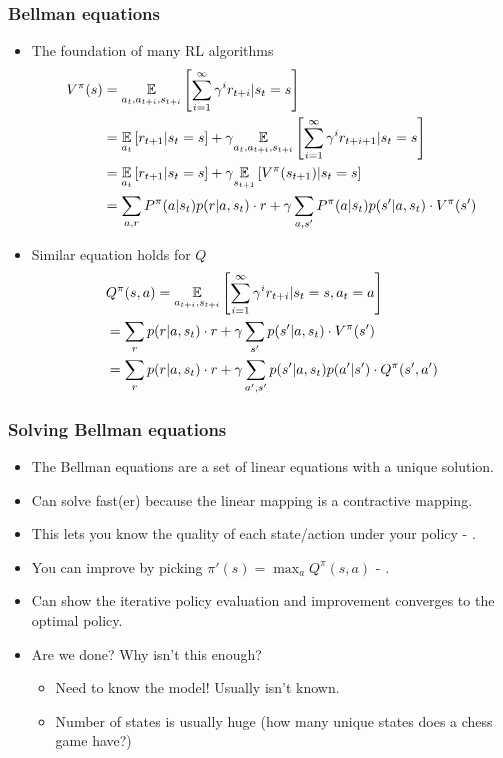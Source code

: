 \documentclass[handout]{beamer}
\begin{document}
\begin{frame}\frametitle{Bellman equations}\small
\begin{itemize}
	\item The foundation of many RL algorithms
	{\footnotesize
	\begin{align*}\footnotesize
	V^\pi(s)&=\underset{a_{t},a_{t+i},s_{t+i}}{\mathbb{E}}\left[\sum_{i=1}^\infty\gamma^{i} r_{t+i} |s_t=s\right] \\
	&=\underset{a_{t}}{\mathbb{E}}\left[r_{t+1} |s_t=s\right]  +\gamma \underset{a_{t},a_{t+i},s_{t+i}}{\mathbb{E}}\left[\sum_{i=1}^\infty\gamma^{i} r_{t+i+1} |s_t=s\right] \\
	& = \underset{a_{t}}{\mathbb{E}}\left[r_{t+1} |s_t=s\right] +\gamma \underset{s_{t+1}}{\mathbb{E}}\left[V^{\pi}(s_{t+1})|s_t=s\right] \\
	& = \sum_{a,r}P^{\pi}(a|s_t)p(r|a,s_t)\cdot r+\gamma \sum_{a,s'}P^{\pi}(a|s_t)p(s'|a,s_t)\cdot V^{\pi}(s')
	\end{align*}}
	\item Similar equation holds for $Q$
		{\footnotesize
		\begin{align*}\footnotesize
		&Q^\pi(s,a)=\underset{a_{t+i},s_{t+i}}{\mathbb{E}}\left[\sum_{i=1}^\infty\gamma^{i} r_{t+i} |s_t=s,a_t=a\right] \\
		& = \sum_{r}p(r|a,s_t)\cdot r+ \gamma\sum_{s'}p(s'|a,s_t)\cdot V^{\pi}(s') \\
		&=\sum_{r}p(r|a,s_t)\cdot r+ \gamma\sum_{a',s'}p(s'|a,s_t)p(a'|s')\cdot Q^{\pi}(s',a')
		\end{align*}}
\end{itemize}
\end{frame}

\begin{frame}\frametitle{Solving Bellman equations}\small
\begin{itemize}
	\item The Bellman equations are a set of linear equations with a unique solution.
	\onslide<2->\item Can solve fast(er) because the linear mapping is a contractive mapping.
	\onslide<3->\item This lets you know the quality of each state/action under your policy - .
	\onslide<4->\item You can improve by picking $\pi'(s)=\max_a Q^{\pi}(s,a)$ - .
	\onslide<5->\item Can show the iterative policy evaluation and improvement converges to the optimal policy.
	\onslide<6->\item Are we done? \onslide<7-> Why isn't this enough?
	\onslide<8->
	\begin{itemize}
		\item Need to know the model! Usually isn't known.
		\item Number of states is usually huge (how many unique states does a chess game have?) 
	\end{itemize}
\end{itemize}
\end{frame}
\end{document}
